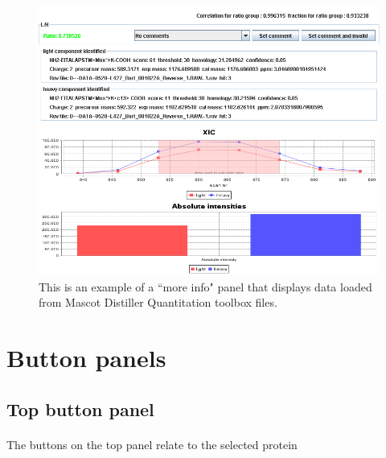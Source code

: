 \documentclass[11pt,a4paper,oneside,notitlepage]{book}
\begin{document}
\begin{figure}[H]
\begin{center}
\includegraphics[scale=0.7]{moreinfopanel.png}
\caption{This is an example of a ``more info" panel that displays data loaded from Mascot Distiller Quantitation toolbox files.}
\label{moreInfoPanel}
\end{center}
\end{figure}

\section{Button panels}
\subsection{Top button panel}\label{Top button panel}

\paragraph{}The buttons on the top panel relate to the selected protein
\end{document}
